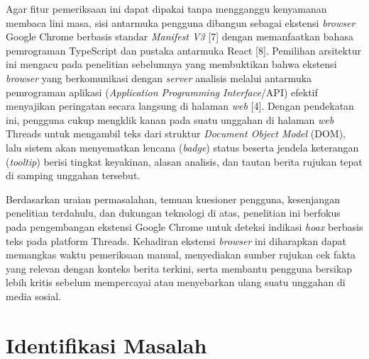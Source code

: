 \documentclass[12pt,a4paper,twoside]{report}
\begin{document}
Agar fitur pemeriksaan ini dapat dipakai tanpa mengganggu kenyamanan membaca lini masa, sisi antarmuka pengguna dibangun sebagai ekstensi \textit{browser} Google Chrome berbasis standar \textit{Manifest V3} [7] dengan memanfaatkan bahasa pemrograman TypeScript dan pustaka antarmuka React [8]. Pemilihan arsitektur ini mengacu pada penelitian sebelumnya yang membuktikan bahwa ekstensi \textit{browser} yang berkomunikasi dengan \textit{server} analisis melalui antarmuka pemrograman aplikasi (\textit{Application Programming Interface}/API) efektif menyajikan peringatan secara langsung di halaman \textit{web} [4]. Dengan pendekatan ini, pengguna cukup mengklik kanan pada suatu unggahan di halaman \textit{web} Threads untuk mengambil teks dari struktur \textit{Document Object Model} (DOM), lalu sistem akan menyematkan lencana (\textit{badge}) status beserta jendela keterangan (\textit{tooltip}) berisi tingkat keyakinan, alasan analisis, dan tautan berita rujukan tepat di samping unggahan tersebut.

Berdasarkan uraian permasalahan, temuan kuesioner pengguna, kesenjangan penelitian terdahulu, dan dukungan teknologi di atas, penelitian ini berfokus pada pengembangan ekstensi Google Chrome untuk deteksi indikasi \textit{hoax} berbasis teks pada platform Threads. Kehadiran ekstensi \textit{browser} ini diharapkan dapat memangkas waktu pemeriksaan manual, menyediakan sumber rujukan cek fakta yang relevan dengan konteks berita terkini, serta membantu pengguna bersikap lebih kritis sebelum mempercayai atau menyebarkan ulang suatu unggahan di media sosial.

\section{Identifikasi Masalah}
\end{document}
